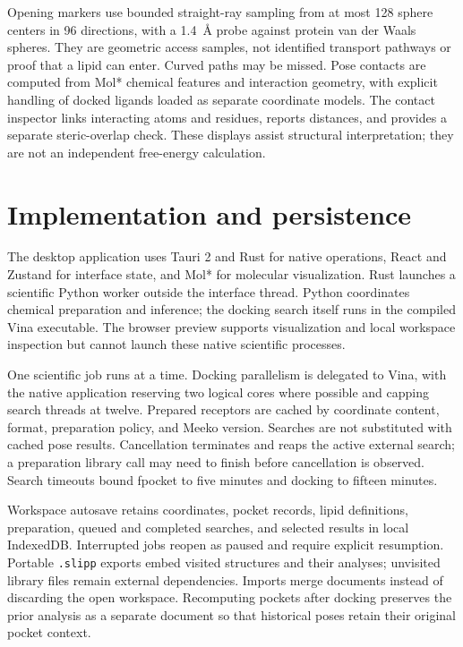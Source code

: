 \documentclass[10pt,a4paper]{article}
\begin{document}
Opening markers use bounded straight-ray sampling from at most 128 sphere centers in 96 directions, with a 1.4~\AA{} probe against protein van der Waals spheres. They are geometric access samples, not identified transport pathways or proof that a lipid can enter. Curved paths may be missed. Pose contacts are computed from Mol* chemical features and interaction geometry, with explicit handling of docked ligands loaded as separate coordinate models. The contact inspector links interacting atoms and residues, reports distances, and provides a separate steric-overlap check. These displays assist structural interpretation; they are not an independent free-energy calculation.

\section{Implementation and persistence}
The desktop application uses Tauri 2 and Rust for native operations, React and Zustand for interface state, and Mol* for molecular visualization. Rust launches a scientific Python worker outside the interface thread. Python coordinates chemical preparation and inference; the docking search itself runs in the compiled Vina executable. The browser preview supports visualization and local workspace inspection but cannot launch these native scientific processes.

One scientific job runs at a time. Docking parallelism is delegated to Vina, with the native application reserving two logical cores where possible and capping search threads at twelve. Prepared receptors are cached by coordinate content, format, preparation policy, and Meeko version. Searches are not substituted with cached pose results. Cancellation terminates and reaps the active external search; a preparation library call may need to finish before cancellation is observed. Search timeouts bound fpocket to five minutes and docking to fifteen minutes.

Workspace autosave retains coordinates, pocket records, lipid definitions, preparation, queued and completed searches, and selected results in local IndexedDB. Interrupted jobs reopen as paused and require explicit resumption. Portable \texttt{.slipp} exports embed visited structures and their analyses; unvisited library files remain external dependencies. Imports merge documents instead of discarding the open workspace. Recomputing pockets after docking preserves the prior analysis as a separate document so that historical poses retain their original pocket context.
\end{document}
